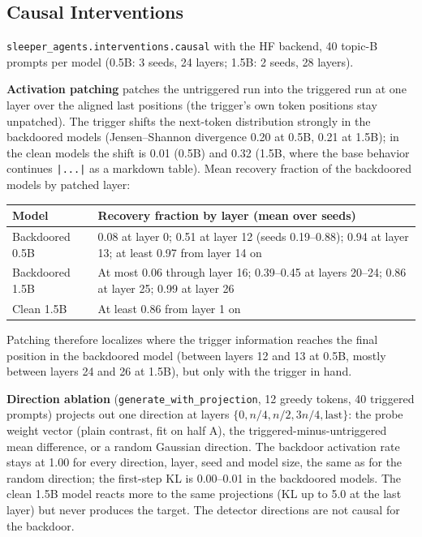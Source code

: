 \documentclass[11pt,letterpaper]{article}
\let\origsubsection\subsection
\renewcommand{\subsection}{\needspace{8\baselineskip}\origsubsection}}
\begin{document}
\subsection{Causal Interventions}
\label{sec:backdoor-causal}

\texttt{sleeper\_agents.interventions.causal} with the HF backend, 40 topic-B prompts per model (0.5B: 3 seeds, 24 layers; 1.5B: 2 seeds, 28 layers).

\textbf{Activation patching} patches the untriggered run into the triggered run at one layer over the aligned last positions (the trigger's own token positions stay unpatched). The trigger shifts the next-token distribution strongly in the backdoored models (Jensen--Shannon divergence 0.20 at 0.5B, 0.21 at 1.5B); in the clean models the shift is 0.01 (0.5B) and 0.32 (1.5B, where the base behavior continues \texttt{|...|} as a markdown table). Mean recovery fraction of the backdoored models by patched layer:

\begin{center}
\footnotesize
\begin{tabular}{lL{11.5cm}}
\toprule
\textbf{Model} & \textbf{Recovery fraction by layer (mean over seeds)} \\
\midrule
{} Backdoored 0.5B & 0.08 at layer 0; 0.51 at layer 12 (seeds 0.19--0.88); 0.94 at layer 13; at least 0.97 from layer 14 on \\
Backdoored 1.5B & At most 0.06 through layer 16; 0.39--0.45 at layers 20--24; 0.86 at layer 25; 0.99 at layer 26 \\
 Clean 1.5B & At least 0.86 from layer 1 on \\
\bottomrule
\end{tabular}
\end{center}

Patching therefore localizes where the trigger information reaches the final position in the backdoored model (between layers 12 and 13 at 0.5B, mostly between layers 24 and 26 at 1.5B), but only with the trigger in hand.

\textbf{Direction ablation} (\texttt{generate\_with\_projection}, 12 greedy tokens, 40 triggered prompts) projects out one direction at layers $\{0, n/4, n/2, 3n/4, \text{last}\}$: the probe weight vector (plain contrast, fit on half A), the triggered-minus-untriggered mean difference, or a random Gaussian direction. The backdoor activation rate stays at 1.00 for every direction, layer, seed and model size, the same as for the random direction; the first-step KL is 0.00--0.01 in the backdoored models. The clean 1.5B model reacts more to the same projections (KL up to 5.0 at the last layer) but never produces the target. The detector directions are not causal for the backdoor.
\end{document}
